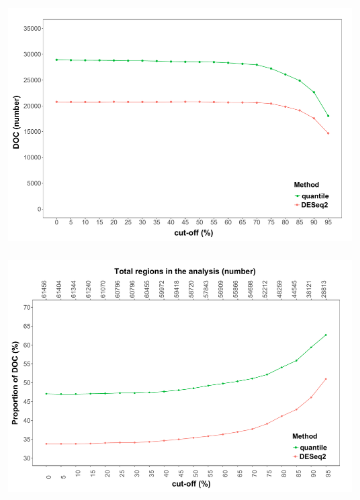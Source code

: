 \begin{figure}[htbp]
\centering
\begin{subfigure}{0.45\textwidth}
\centering
\includegraphics[width=\textwidth]{./Results1/pdfs/ATAC_Core_CD4vsCD14_DOC_FDR_01_vs_cutoffs_quantile_DESeq2_only}
\caption{\textbf{}}
\end{subfigure}%
\begin{subfigure}{0.45\textwidth}
\centering
\includegraphics[width=\textwidth]{./Results1/pdfs/ATAC_Core_CD4vsCD14_proportion_DOC_FDR_01_vs_cutoffs_quantile_DESeq2_only}
\caption{\textbf{}}
\end{subfigure}
\begin{subfigure}{0.5\textwidth}
\centering

\end{subfigure}
\end{figure}
